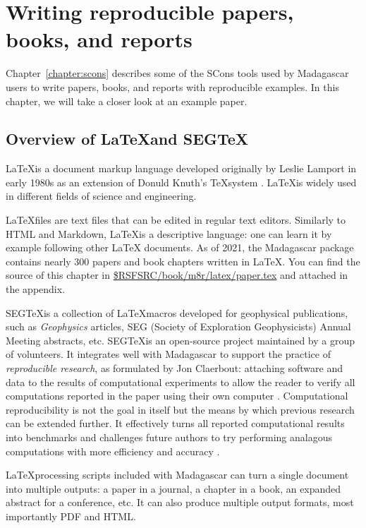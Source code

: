 \chapter{Writing reproducible papers, books, and reports}

Chapter~\ref{chapter:scons} describes some of the SCons tools used by
Madagascar users to write papers, books, and reports with reproducible
examples. In this chapter, we will take a closer look at an example paper.

\section{Overview of \LaTeX and SEG\TeX}

\LaTeX is a document markup language developed originally by Leslie
Lamport in early 1980s \cite[]{latex} as an extension of Donuld
Knuth's \TeX system \cite[]{tex}. \LaTeX is widely used in different
fields of science and engineering.

\LaTeX files are text files that can be edited in regular text
editors. Similarly to HTML and Markdown, \LaTeX is a descriptive
language: one can learn it by example following other \LaTeX
documents. As of 2021, the Madagascar package contains nearly 300
papers and book chapters written in \LaTeX. You can find the source of
this chapter in
\href{https://github.com/ahay/src/blob/master/book/m8r/latex/paper.tex}
     {\$RSFSRC/book/m8r/latex/paper.tex}
and attached in the appendix.

SEG\TeX is a collection of \LaTeX macros developed for geophysical
publications, such as \emph{Geophysics} articles, SEG (Society of
Exploration Geophysicists) Annual Meeting abstracts, etc. SEG\TeX is
an open-source project maintained by a group of volunteers. It
integrates well with Madagascar to support the practice of
\emph{reproducible research}, as formulated by Jon Claerbout:
attaching software and data to the results of computational
experiments to allow the reader to verify all computations reported in
the paper using their own computer
\cite[]{fomel2008guest}. Computational reproducibility is not the goal
in itself but the means by which previous research can be extended
further. It effectively turns all reported computational results into
benchmarks and challenges future authors to try performing analagous
computations with more efficiency and accuracy \cite[]{fomel2014reproducible}.

\LaTeX processing scripts included with Madagascar can turn a single
document into multiple outputs: a paper in a journal, a chapter in a
book, an expanded abstract for a conference, etc. It can also produce
multiple output formats, most importantly PDF and HTML.

